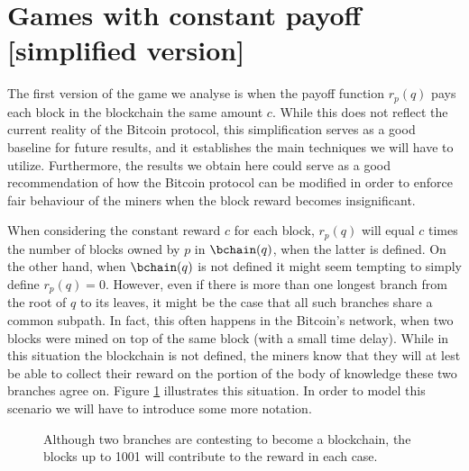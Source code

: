 

\section{Games with constant payoff [simplified version]}
\label{sec-const_rew}

The first version of the game we analyse is when the payoff function $r_p(q)$ pays each block in the blockchain the same amount $c$. While this does not reflect the current reality of the Bitcoin protocol, this simplification serves as a good baseline for future results, and it establishes the main techniques we will have to utilize. Furthermore, the results we obtain here could serve as a good recommendation of how the Bitcoin protocol can be modified in order to enforce fair behaviour of the miners when the block reward becomes insignificant.

When considering the constant reward $c$ for each block, $r_p(q)$ will equal $c$ times the number of blocks owned by $p$ in $\bchain(q)$, when the latter is defined. On the other hand, when $\bchain(q)$ is not defined it might seem tempting to simply define $r_p(q) = 0$. However, even if there is more than one longest branch from the root of $q$ to its leaves, it might be the case that all such branches share a common subpath. In fact, this often happens in the Bitcoin's network, when two blocks were mined on top of the same block (with a small time delay). While in this situation the blockchain is not defined, the miners know that they will at lest be able to collect their reward on the portion of the body of knowledge these two branches agree on. Figure \ref{fig-simple-fork} illustrates this situation. In order to model this scenario we will have to introduce some more notation. 

\begin{figure}
\begin{center}
\end{center}
\label{fig-simple-fork}
\caption{Although two branches are contesting to become a blockchain, the blocks up to 1001 will contribute to the reward in each case.}
\end{figure}


